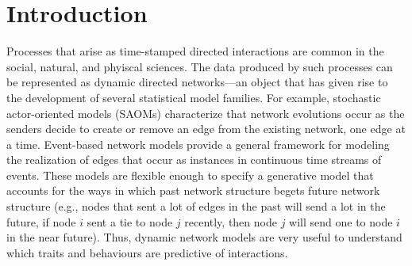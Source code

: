 \documentclass[ba]{imsart}
\numberwithin{equation}{section}
\theoremstyle{plain}
\begin{document}
\begin{frontmatter}
		\begin{keyword}[class=MSC]
		\end{keyword}
		
		\begin{keyword}
		\end{keyword}
		
	\end{frontmatter}
	
	\section{Introduction}\label{sec:introduction}
	
	Processes that arise as time-stamped directed interactions are common in the social, natural, and phyiscal sciences. The data produced by such processes can be represented as dynamic directed networks---an object that has given rise to the development of several statistical model families. For example, stochastic actor-oriented models (SAOMs) \citep{snijders1996stochastic,snijders2007modeling} characterize that network evolutions occur as the senders decide to create or remove an edge from the existing network, one edge at a time. Event-based network models \citep{Butts2008,Vu2011,hunter2011dynamic,PerryWolfe2012} provide a general framework for modeling the realization of edges that occur as instances in continuous time streams of events. These models are flexible enough to specify a generative model that accounts for the ways in which past network structure begets future network structure (e.g., nodes that sent a lot of edges in the past will send a lot in the future, if node $i$ sent a tie to node $j$ recently, then node $j$ will send one to node $i$ in the near future). Thus, dynamic network models are very useful to understand which traits and behaviours are predictive of interactions. 
	
\end{document}
